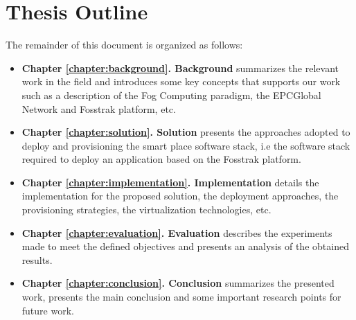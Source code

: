 \section{Thesis Outline}
\label{section:outline}
The remainder of this document is organized as follows:
\begin{itemize}
  \item \textbf{Chapter \ref{chapter:background}. Background} summarizes the relevant work in the field and
  introduces some key concepts that supports our work such as a description of the Fog Computing paradigm,
  the EPCGlobal Network and Fosstrak platform, etc.
  \item \textbf{Chapter \ref{chapter:solution}. Solution} presents the approaches adopted to deploy
  and provisioning the smart place software stack, i.e the software stack required to deploy
  an application based on the Fosstrak platform.
  \item \textbf{Chapter \ref{chapter:implementation}. Implementation} details the implementation
  for the proposed solution, the deployment approaches, the provisioning strategies, the virtualization
  technologies, etc.
  \item \textbf{Chapter \ref{chapter:evaluation}. Evaluation} describes the experiments made to meet
  the defined objectives and presents an analysis of the obtained results.
  \item \textbf{Chapter \ref{chapter:conclusion}. Conclusion} summarizes the presented work,
  presents the main conclusion and some important research points for future work.
\end{itemize}
